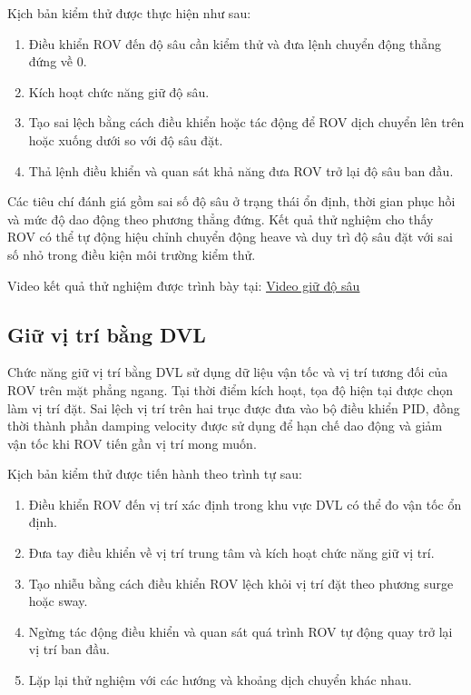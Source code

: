 \documentclass[../DoAn.tex]{subfiles}
\begin{document}
Kịch bản kiểm thử được thực hiện như sau:

\begin{enumerate}
\item Điều khiển ROV đến độ sâu cần kiểm thử và đưa lệnh chuyển động thẳng đứng về 0.
\item Kích hoạt chức năng giữ độ sâu.
\item Tạo sai lệch bằng cách điều khiển hoặc tác động để ROV dịch chuyển lên trên hoặc xuống dưới so với độ sâu đặt.
\item Thả lệnh điều khiển và quan sát khả năng đưa ROV trở lại độ sâu ban đầu.
\end{enumerate}

Các tiêu chí đánh giá gồm sai số độ sâu ở trạng thái ổn định, thời gian phục hồi và mức độ dao động theo phương thẳng đứng. Kết quả thử nghiệm cho thấy ROV có thể tự động hiệu chỉnh chuyển động heave và duy trì độ sâu đặt với sai số nhỏ trong điều kiện môi trường kiểm thử.

Video kết quả thử nghiệm được trình bày tại: \href{https://drive.google.com/file/d/1rkvtuPk5gjZ3EpsakQTx7oA0ciTpmEK_/view?usp=sharing}{\underline{Video giữ độ sâu}}

\subsection{Giữ vị trí bằng DVL}

Chức năng giữ vị trí bằng DVL sử dụng dữ liệu vận tốc và vị trí tương đối của ROV trên mặt phẳng ngang. Tại thời điểm kích hoạt, tọa độ hiện tại được chọn làm vị trí đặt. Sai lệch vị trí trên hai trục được đưa vào bộ điều khiển PID, đồng thời thành phần damping velocity được sử dụng để hạn chế dao động và giảm vận tốc khi ROV tiến gần vị trí mong muốn.

Kịch bản kiểm thử được tiến hành theo trình tự sau:

\begin{enumerate}
\item Điều khiển ROV đến vị trí xác định trong khu vực DVL có thể đo vận tốc ổn định.
\item Đưa tay điều khiển về vị trí trung tâm và kích hoạt chức năng giữ vị trí.
\item Tạo nhiễu bằng cách điều khiển ROV lệch khỏi vị trí đặt theo phương surge hoặc sway.
\item Ngừng tác động điều khiển và quan sát quá trình ROV tự động quay trở lại vị trí ban đầu.
\item Lặp lại thử nghiệm với các hướng và khoảng dịch chuyển khác nhau.
\end{enumerate}
\end{document}
